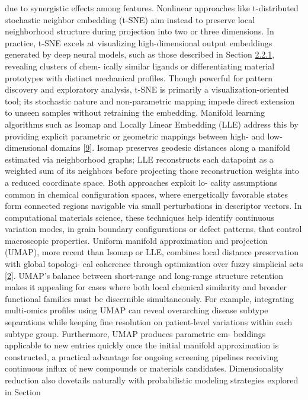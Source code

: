 \documentclass[
]{article}
\begin{document}
due to synergistic effects among features. Nonlinear approaches like
t-distributed stochastic neighbor embedding (t-SNE) aim instead to
preserve local neighborhood structure during projection into two or
three dimensions. In practice, t-SNE excels at visualizing
high-dimensional output embeddings generated by deep neural models, such
as those described in Section
\hyperref[feature-encoding-and-transformation]{2.2.1}, revealing
clusters of chem- ically similar ligands or differentiating material
prototypes with distinct mechanical profiles. Though powerful for
pattern discovery and exploratory analysis, t-SNE is primarily a
visualization-oriented tool; its stochastic nature and non-parametric
mapping impede direct extension to unseen samples without retraining the
embedding. Manifold learning algorithms such as Isomap and Locally
Linear Embedding (LLE) address this by providing explicit parametric or
geometric mappings between high- and low-dimensional domains
{[}\hyperref[_bookmark49]{9}{]}. Isomap preserves geodesic distances
along a manifold estimated via neighborhood graphs; LLE reconstructs
each datapoint as a weighted sum of its neighbors before projecting
those reconstruction weights into a reduced coordinate space. Both
approaches exploit lo- cality assumptions common in chemical
configuration spaces, where energetically favorable states form
connected regions navigable via small perturbations in descriptor
vectors. In computational materials science, these techniques help
identify continuous variation modes, in grain boundary configurations or
defect patterns, that control macroscopic properties. Uniform manifold
approximation and projection (UMAP), more recent than Isomap or LLE,
combines local distance preservation with global topologi- cal coherence
through optimization over fuzzy simplicial sets
{[}\hyperref[_bookmark42]{2}{]}. UMAP's balance between short-range and
long-range structure retention makes it appealing for cases where both
local chemical similarity and broader functional families must be
discernible simultaneously. For example, integrating multi-omics
profiles using UMAP can reveal overarching disease subtype separations
while keeping fine resolution on patient-level variations within each
subtype group. Furthermore, UMAP produces parametric em- beddings
applicable to new entries quickly once the initial manifold
approximation is constructed, a practical advantage for ongoing
screening pipelines receiving continuous influx of new compounds or
materials candidates. Dimensionality reduction also dovetails naturally
with probabilistic modeling strategies explored in Section
\end{document}
